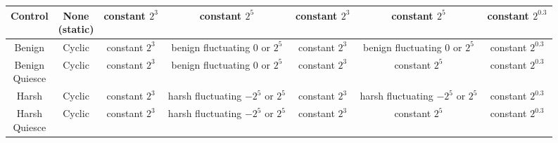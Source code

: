 \documentclass[PhD]{msu-thesis}
\begin{document}
\begin{table}[]
\begin{tabular}{|c|c||c|c||c|c|c|}
	Control & \makecell{None \\ (static)} & \makecell{constant \\ $2^3$} & \makecell{constant \\ $2^5$} & \makecell{constant \\ $2^3$} & \makecell{constant \\ $2^5$} & \makecell{constant \\ $2^{0.3}$} \\\hline
	Benign & Cyclic & \makecell{constant \\ $2^3$} & \makecell{benign \\ fluctuating \\ 0 or $2^5$} & \makecell{constant \\ $2^3$} & \makecell{benign \\ fluctuating \\ 0 or $2^5$} & \makecell{constant \\ $2^{0.3}$} \\\hline
	\makecell{Benign \\ Quiesce} & Cyclic & \makecell{constant \\ $2^3$} & \makecell{benign \\ fluctuating \\ 0 or $2^5$} & \makecell{constant \\ $2^3$} & \makecell{constant \\ $2^5$} & \makecell{constant \\ $2^{0.3}$} \\\hline
	Harsh & Cyclic & \makecell{constant \\ $2^3$} & \makecell{harsh \\ fluctuating \\ $-2^5$ or $2^5$} & \makecell{constant \\ $2^3$} & \makecell{harsh \\ fluctuating \\ $-2^5$ or $2^5$} & \makecell{constant \\ $2^{0.3}$} \\\hline
	\makecell{Harsh \\ Quiesce} & Cyclic & \makecell{constant \\ $2^3$} & \makecell{harsh \\ fluctuating \\ $-2^5$ or $2^5$} & \makecell{constant \\ $2^3$} & \makecell{constant \\ $2^5$} & \makecell{constant \\ $2^{0.3}$} \\\hline


\end{tabular}
\end{table}
\end{document}
